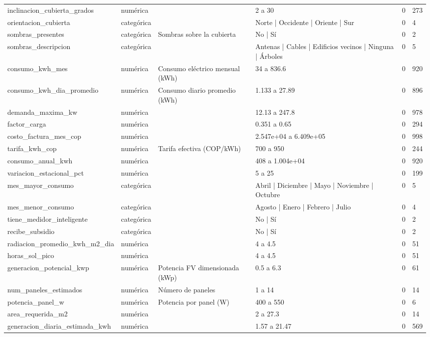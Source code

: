 {\begin{longtable}{@{}p{}lp{}p{}ll@{}}
inclinacion\_cubierta\_grados & numérica &  & 2 a 30 & 0 & 273 \\
orientacion\_cubierta & categórica &  & Norte | Occidente | Oriente | Sur & 0 & 4 \\
sombras\_presentes & categórica & Sombras sobre la cubierta & No | Sí & 0 & 2 \\
sombras\_descripcion & categórica &  & Antenas | Cables | Edificios vecinos | Ninguna | Árboles & 0 & 5 \\
consumo\_kwh\_mes & numérica & Consumo eléctrico mensual (kWh) & 34 a 836.6 & 0 & 920 \\
consumo\_kwh\_dia\_promedio & numérica & Consumo diario promedio (kWh) & 1.133 a 27.89 & 0 & 896 \\
demanda\_maxima\_kw & numérica &  & 12.13 a 247.8 & 0 & 978 \\
factor\_carga & numérica &  & 0.351 a 0.65 & 0 & 294 \\
costo\_factura\_mes\_cop & numérica &  & 2.547e+04 a 6.409e+05 & 0 & 998 \\
tarifa\_kwh\_cop & numérica & Tarifa efectiva (COP/kWh) & 700 a 950 & 0 & 244 \\
consumo\_anual\_kwh & numérica &  & 408 a 1.004e+04 & 0 & 920 \\
variacion\_estacional\_pct & numérica &  & 5 a 25 & 0 & 199 \\
mes\_mayor\_consumo & categórica &  & Abril | Diciembre | Mayo | Noviembre | Octubre & 0 & 5 \\
mes\_menor\_consumo & categórica &  & Agosto | Enero | Febrero | Julio & 0 & 4 \\
tiene\_medidor\_inteligente & categórica &  & No | Sí & 0 & 2 \\
recibe\_subsidio & categórica &  & No | Sí & 0 & 2 \\
radiacion\_promedio\_kwh\_m2\_dia & numérica &  & 4 a 4.5 & 0 & 51 \\
horas\_sol\_pico & numérica &  & 4 a 4.5 & 0 & 51 \\
generacion\_potencial\_kwp & numérica & Potencia FV dimensionada (kWp) & 0.5 a 6.3 & 0 & 61 \\
num\_paneles\_estimados & numérica & Número de paneles & 1 a 14 & 0 & 14 \\
potencia\_panel\_w & numérica & Potencia por panel (W) & 400 a 550 & 0 & 6 \\
area\_requerida\_m2 & numérica &  & 2 a 27.3 & 0 & 14 \\
generacion\_diaria\_estimada\_kwh & numérica &  & 1.57 a 21.47 & 0 & 569 \\
\bottomrule
\end{longtable}}
